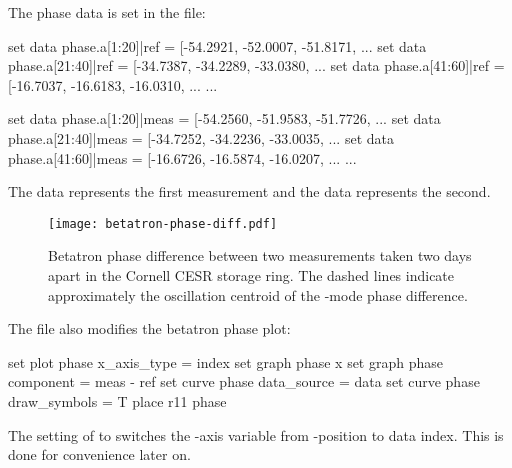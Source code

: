 \documentclass{hitec}     %
\begin{document}
The phase data is set in the  file:
\begin{code}
set data phase.a[1:20]|ref = [-54.2921, -52.0007, -51.8171, ...
set data phase.a[21:40]|ref = [-34.7387, -34.2289, -33.0380, ...
set data phase.a[41:60]|ref = [-16.7037, -16.6183, -16.0310, ...
...

set data phase.a[1:20]|meas = [-54.2560, -51.9583, -51.7726, ...
set data phase.a[21:40]|meas = [-34.7252, -34.2236, -33.0035, ...
set data phase.a[41:60]|meas = [-16.6726, -16.5874, -16.0207, ...
...
\end{code}
The  data represents the first measurement and the  data represents the second.

\begin{figure}[tb]
  \centering
  \texttt{[image: betatron-phase-diff.pdf]}
  \caption{
Betatron phase difference between two measurements taken two days apart in the Cornell CESR storage
ring. The dashed lines indicate approximately the oscillation centroid of the -mode phase difference.
  }
  \label{f:phase.diff}
\end{figure}

The  file also modifies the betatron phase plot:
\begin{code}
set plot phase x_axis_type = index
set graph phase x%
set graph phase component = meas - ref
set curve phase data_source = data
set curve phase draw_symbols = T
place r11 phase
\end{code}
The setting of  to  switches the -axis variable from -position
to data index. This is done for convenience later on. 
\end{document}
